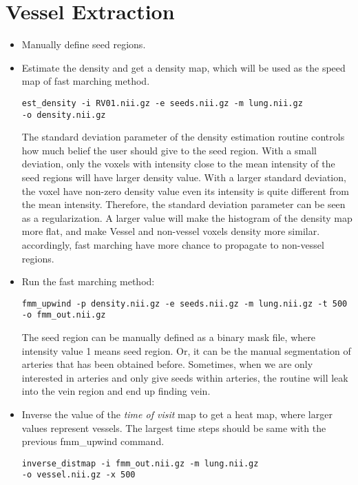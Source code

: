 \documentclass[11pt]{article}
\begin{document}
\section{Vessel Extraction}
\begin{itemize}
\item Manually define seed regions.

\item Estimate the density and get a density map, which will be used as the
  speed map of fast marching method. 
\begin{Verbatim}[frame=single]
est_density -i RV01.nii.gz -e seeds.nii.gz -m lung.nii.gz 
-o density.nii.gz
\end{Verbatim}
The standard deviation parameter of the density estimation routine controls
how much belief the user should give to the seed region. With a small
deviation, only the voxels with intensity close to the mean intensity of the
seed regions will have larger density value. With a larger standard deviation,
the voxel have non-zero density value even its intensity is quite different
from the mean intensity. Therefore, the standard deviation parameter can be
seen as a regularization. A larger value will make the histogram of the
density map more flat, and make Vessel and non-vessel voxels density more
similar. accordingly, fast marching have more chance to propagate to
non-vessel regions.

  \item Run the fast marching method:
\begin{Verbatim}[frame=single]
fmm_upwind -p density.nii.gz -e seeds.nii.gz -m lung.nii.gz -t 500 
-o fmm_out.nii.gz
\end{Verbatim}
The seed region can be manually defined as a binary mask file, where intensity
value 1 means seed region. Or, it can be the manual segmentation of arteries
that has been obtained before. Sometimes, when we are only interested in
arteries and only give seeds within arteries, the routine will leak into the
vein region and end up finding vein. 

\item Inverse the value of the \emph{time of visit} map to get a heat map,
  where larger values represent vessels. The largest time steps should be same
  with the previous \textsf{fmm\_upwind} command. 
\begin{Verbatim}[frame=single]
inverse_distmap -i fmm_out.nii.gz -m lung.nii.gz 
-o vessel.nii.gz -x 500
\end{Verbatim}
\end{itemize}



\end{document}
